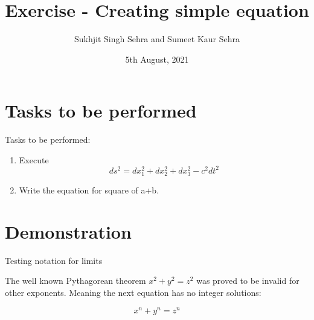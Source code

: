 \documentclass{article}
\title{Exercise - Creating simple equation}
\author{Sukhjit Singh Sehra and Sumeet Kaur Sehra}
\date{5th August, 2021}
\begin{document}
	\maketitle
	
	\section*{Tasks to be performed}
	Tasks to be performed:
	\begin{enumerate}
		\item Execute \[ ds^2 = dx_1^2 + dx_2^2 + dx_3^2 - c^2 dt^2 \]
		\item Write the equation for square of a+b.
	\end{enumerate}
	\section*{Demonstration}
Testing notation for limits
 

 
	
	
The well known Pythagorean theorem \(x^2 + y^2 = z^2\) was 
proved to be invalid for other exponents. 
Meaning the next equation has no integer solutions:

\[ x^n + y^n = z^n \]
\end{document}
